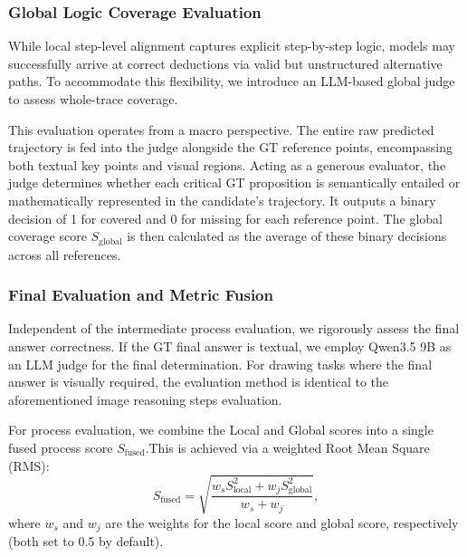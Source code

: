 \documentclass[11pt]{article}
\begin{document}
\subsubsection{\textbf{Global Logic Coverage Evaluation}}
\label{sec:eval_global}

While local step-level alignment captures explicit step-by-step logic, models may successfully arrive at correct deductions via valid but unstructured alternative paths. To accommodate this flexibility, we introduce an LLM-based global judge to assess whole-trace coverage.

This evaluation operates from a macro perspective. The entire raw predicted trajectory is fed into the judge alongside the GT reference points, encompassing both textual key points and visual regions. Acting as a generous evaluator, the judge determines whether each critical GT proposition is semantically entailed or mathematically represented in the candidate's trajectory. It outputs a binary decision of 1 for covered and 0 for missing for each reference point. The global coverage score $S_{\text{global}}$ is then calculated as the average of these binary decisions across all references.

\subsubsection{\textbf{Final Evaluation and Metric Fusion}}
\label{sec:eval_fusion}

Independent of the intermediate process evaluation, we rigorously assess the final answer correctness. If the GT final answer is textual, we employ Qwen3.5 9B as an LLM judge for the final determination. For drawing tasks where the final answer is visually required, the evaluation method is identical to the aforementioned image reasoning steps evaluation.

For process evaluation, we combine the Local and Global scores into a single fused process score $S_{\text{fused}}$.This is achieved via a weighted Root Mean Square (RMS):
\begin{equation}
S_{\text{fused}} = \sqrt{\frac{w_s S_{\text{local}}^2 + w_j S_{\text{global}}^2}{w_s + w_j}},\label{eq:fused-score}
\end{equation}
where $w_s$ and $w_j$ are the weights for the local score and global score, respectively (both set to 0.5 by default).
\end{document}
